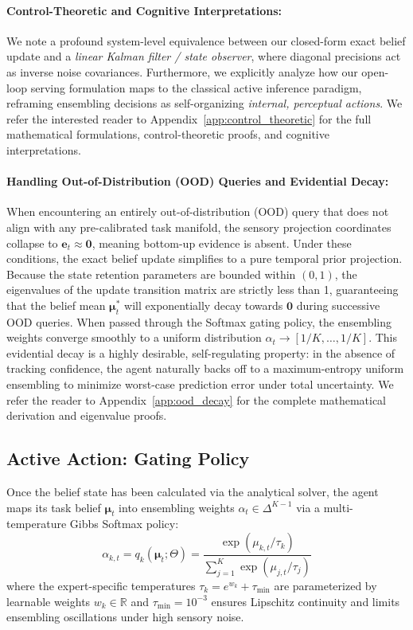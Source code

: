 \paragraph{Control-Theoretic and Cognitive Interpretations:}
We note a profound system-level equivalence between our closed-form exact belief update and a \emph{linear Kalman filter / state observer}, where diagonal precisions act as inverse noise covariances. Furthermore, we explicitly analyze how our open-loop serving formulation maps to the classical active inference paradigm, reframing ensembling decisions as self-organizing \emph{internal, perceptual actions}. We refer the interested reader to Appendix~\ref{app:control_theoretic} for the full mathematical formulations, control-theoretic proofs, and cognitive interpretations.

\paragraph{Handling Out-of-Distribution (OOD) Queries and Evidential Decay:}
When encountering an entirely out-of-distribution (OOD) query that does not align with any pre-calibrated task manifold, the sensory projection coordinates collapse to $\mathbf{e}_t \approx \mathbf{0}$, meaning bottom-up evidence is absent. Under these conditions, the exact belief update simplifies to a pure temporal prior projection. Because the state retention parameters are bounded within $(0, 1)$, the eigenvalues of the update transition matrix are strictly less than 1, guaranteeing that the belief mean $\mathbf{\mu}_t^*$ will exponentially decay towards $\mathbf{0}$ during successive OOD queries. When passed through the Softmax gating policy, the ensembling weights converge smoothly to a uniform distribution $\alpha_t \to [1/K, \dots, 1/K]$. This evidential decay is a highly desirable, self-regulating property: in the absence of tracking confidence, the agent naturally backs off to a maximum-entropy uniform ensembling to minimize worst-case prediction error under total uncertainty. We refer the reader to Appendix~\ref{app:ood_decay} for the complete mathematical derivation and eigenvalue proofs.

\subsection{Active Action: Gating Policy}
Once the belief state has been calculated via the analytical solver, the agent maps its task belief $\mathbf{\mu}_t$ into ensembling weights $\alpha_t \in \Delta^{K-1}$ via a multi-temperature Gibbs Softmax policy:
\begin{equation}
\alpha_{k, t} = q_k(\mathbf{\mu}_t; \Theta) = \frac{\exp(\mu_{k, t}/\tau_k)}{\sum_{j=1}^K \exp(\mu_{j, t}/\tau_j)}
\end{equation}
where the expert-specific temperatures $\tau_k = e^{w_k} + \tau_{\min}$ are parameterized by learnable weights $w_k \in \mathbb{R}$ and $\tau_{\min} = 10^{-3}$ ensures Lipschitz continuity and limits ensembling oscillations under high sensory noise.

